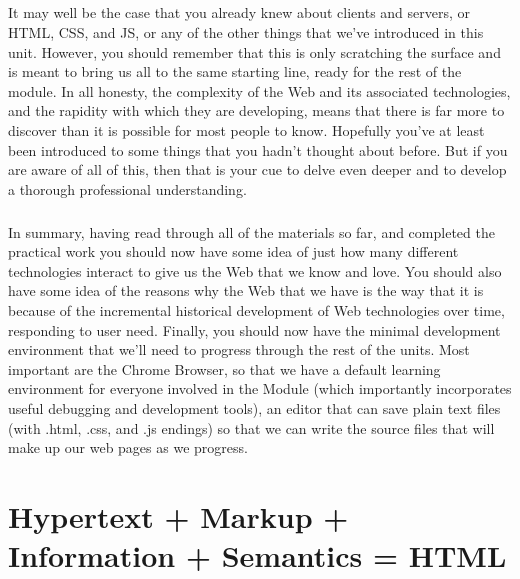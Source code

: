 \documentclass[12pt, a4paper, oneside]{book}
\begin{document}
\paragraph{} It may well be the case that you already knew about clients and servers, or HTML, CSS, and JS, or any of the other things that we've introduced in this unit. However, you should remember that this is only scratching the surface and is meant to bring us all to the same starting line, ready for the rest of the module. In all honesty, the complexity of the Web and its associated technologies, and the rapidity with which they are developing, means that there is far more to discover than it is possible for most people to know. Hopefully you've at least been introduced to some things that you hadn't thought about before. But if you are aware of all of this, then that is your cue to delve even deeper and to develop a thorough professional understanding.
\paragraph{} In summary, having read through all of the materials so far, and completed the practical work you should now have some idea of just how many different technologies interact to give us the Web that we know and love. You should also have some idea of the reasons why the Web that we have is the way that it is because of the incremental historical development of Web technologies over time, responding to user need. Finally, you should now have the minimal development environment that we'll need to progress through the rest of the units. Most important are the Chrome Browser, so that we have a default learning environment for everyone involved in the Module (which importantly incorporates useful debugging and development tools), an editor that can save plain text files (with .html, .css, and .js endings) so that we can write the source files that will make up our web pages as we progress.



\chapter{Hypertext + Markup + Information + Semantics = HTML}
\label{html}
\paragraph{} 
\end{document}
